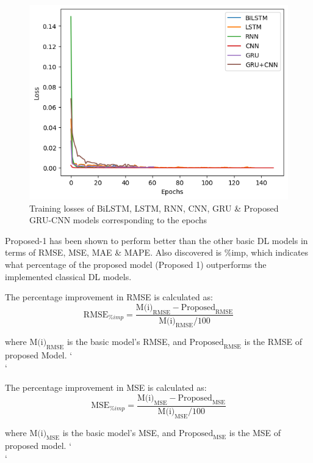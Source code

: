 \documentclass[a4paper, fleqn]{cas-sc}
\begin{document}
  \begin{figure}[h!]
   \centering
   \includegraphics[scale=.5]{val_loss.png}
    \caption{Training losses of BiLSTM, LSTM, RNN, CNN, GRU \& Proposed GRU-CNN models corresponding to the epochs}
    \label{Fig:12}
  \end{figure}



Proposed-1 has been shown to perform better than the other basic DL models in terms of RMSE, MSE, MAE \& MAPE.  Also discovered is \%imp, which indicates what percentage of the proposed model (Proposed 1) outperforms the implemented classical DL models.


The percentage improvement in RMSE is calculated as:
\begin{equation}
    \text{RMSE}_{\%imp} = \frac{\text{M(i)}_{\text{RMSE}} - \text{Proposed}_{\text{RMSE}}}{\text{M(i)}_{\text{RMSE}}/100}
\end{equation}

where $\text{M(i)}_{\text{RMSE}}$ is the basic model's RMSE,  and $\text{Proposed}_{\text{RMSE}}$ is the RMSE of proposed Model. `\\`

The percentage improvement in MSE is calculated as:
\begin{equation}
    \text{MSE}_{\%imp} = \frac{\text{M(i)}_{\text{MSE}} - \text{Proposed}_{\text{MSE}}}{\text{M(i)}_{\text{MSE}}/100}
\end{equation}

where $\text{M(i)}_{\text{MSE}}$ is the basic model's MSE,  and $\text{Proposed}_{\text{MSE}}$ is the MSE of proposed model. `\\`
\end{document}
